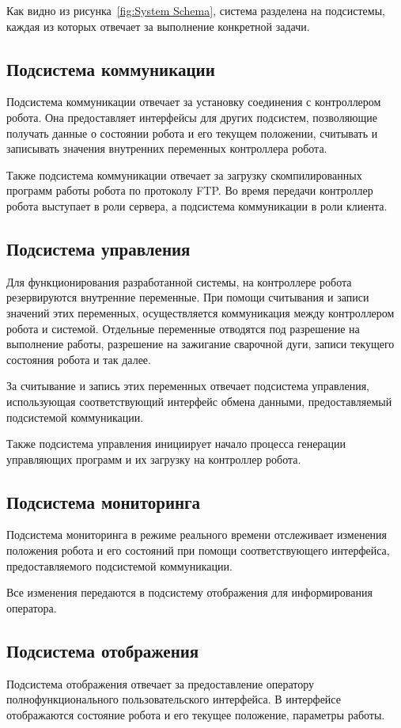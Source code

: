 Как видно из рисунка~\ref{fig:System Schema}, система разделена на подсистемы, каждая из которых отвечает за выполнение конкретной задачи.

\subsection{Подсистема коммуникации}
Подсистема коммуникации отвечает за установку соединения с контроллером робота.
Она предоставляет интерфейсы для других подсистем, позволяющие получать данные о состоянии робота и его текущем положении, считывать и записывать значения внутренних переменных контроллера робота.

Также подсистема коммуникации отвечает за загрузку скомпилированных программ работы робота по протоколу FTP. Во время передачи контроллер робота выступает в роли сервера, а подсистема коммуникации в роли клиента.

\subsection{Подсистема управления}
Для функционирования разработанной системы, на контроллере робота резервируются внутренние переменные.
При помощи считывания и записи значений этих переменных, осуществляется коммуникация между контроллером робота и системой.
Отдельные переменные отводятся под разрешение на выполнение работы, разрешение на зажигание сварочной дуги, записи текущего состояния робота и так далее.

За считывание и запись этих переменных отвечает подсистема управления, использующая соответствующий интерфейс обмена данными, предоставляемый подсистемой коммуникации.

Также подсистема управления инициирует начало процесса генерации управляющих программ и их загрузку на контроллер робота.

\subsection{Подсистема мониторинга}
Подсистема мониторинга в режиме реального времени отслеживает изменения положения робота и его состояний при помощи соответствующего интерфейса, предоставляемого подсистемой коммуникации.

Все изменения передаются в подсистему отображения для информирования оператора.

\subsection{Подсистема отображения}
Подсистема отображения отвечает за предоставление оператору полнофункционального пользовательского интерфейса.
В интерфейсе отображаются состояние робота и его текущее положение, параметры работы.

